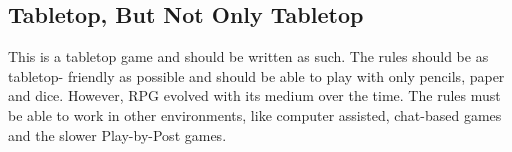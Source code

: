 \begin{multicols}{2}
\subsection{Tabletop, But Not Only Tabletop}
\label{subsec:tabletop}
This is a tabletop game and should be
written as such. The rules should be as tabletop-
friendly as possible and should be able to play with
only pencils, paper and dice. However, RPG
evolved with its medium over the time. The rules
must be able to work in other environments, like
computer assisted, chat-based games and the
slower Play-by-Post games.

\end{multicols}